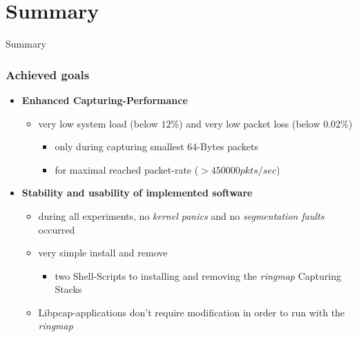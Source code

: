 \documentclass{beamer}
\begin{document}
\section{Summary}
\begin{frame}
	\begin{center}
	\huge{Summary}
	\end{center}
\end{frame}
\begin{frame}
\frametitle{Achieved goals}
\begin{itemize}
	\item \textbf{Enhanced Capturing-Performance}
		\begin{itemize}
			\item very low  system load (below $12\%$) and very low
				packet loss  (below  $0.02\%$)
				\begin{itemize}
					\item only during capturing smallest  64-Bytes packets
					\item for maximal reached packet-rate ($ > 450000 pkts/sec$)
				\end{itemize}
		\end{itemize}
	\item \textbf{Stability and usability of implemented software}
		\begin{itemize}
			\item during all experiments, no \emph{kernel panics} and no \emph{segmentation faults} occurred
			\item very simple install and remove
				\begin{itemize}
					\item two Shell-Scripts to installing  and removing the   
						\emph{ringmap} Capturing Stacks
				\end{itemize}
			\item Libpcap-applications don't require modification in order to run with the \emph{ringmap}
		\end{itemize}
\end{itemize}
\end{frame}
\end{document}
